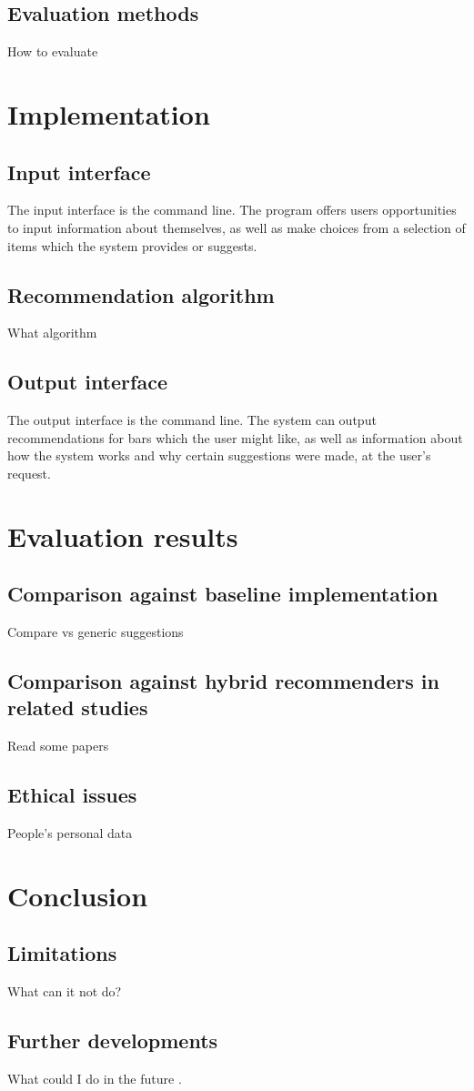 \documentclass[conference]{IEEEtran}
\begin{document}
\subsection{Evaluation methods}
How to evaluate


\section{Implementation}

\subsection{Input interface}
The input interface is the command line.
The program offers users opportunities to input information about themselves,
as well as make choices from a selection of items which the system provides or suggests.

\subsection{Recommendation algorithm}
What algorithm

\subsection{Output interface}
The output interface is the command line.
The system can output recommendations for bars which the user might like,
as well as information about how the system works and why certain suggestions were made,
at the user's request.


\section{Evaluation results}

\subsection{Comparison against baseline implementation}
Compare vs generic suggestions

\subsection{Comparison against hybrid recommenders in related studies}
Read some papers

\subsection{Ethical issues}
People's personal data


\section{Conclusion}

\subsection{Limitations}
What can it not do?

\subsection{Further developments}
What could I do in the future \cite{5284958}. 




\end{document}
